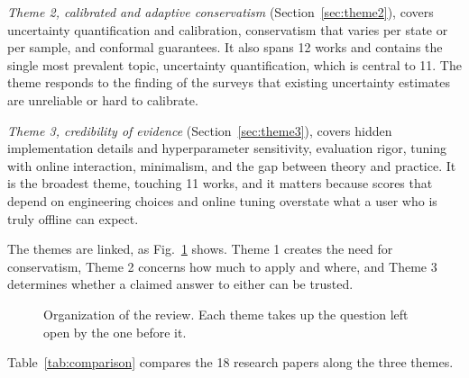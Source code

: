 \documentclass[conference]{IEEEtran}
\begin{document}
\emph{Theme 2, calibrated and adaptive conservatism} (Section~\ref{sec:theme2}), covers uncertainty quantification and calibration, conservatism that varies per state or per sample, and conformal guarantees. It also spans 12 works and contains the single most prevalent topic, uncertainty quantification, which is central to 11. The theme responds to the finding of the surveys that existing uncertainty estimates are unreliable or hard to calibrate.

\emph{Theme 3, credibility of evidence} (Section~\ref{sec:theme3}), covers hidden implementation details and hyperparameter sensitivity, evaluation rigor, tuning with online interaction, minimalism, and the gap between theory and practice. It is the broadest theme, touching 11 works, and it matters because scores that depend on engineering choices and online tuning overstate what a user who is truly offline can expect.

The themes are linked, as Fig.~\ref{fig:themes} shows. Theme 1 creates the need for conservatism, Theme 2 concerns how much to apply and where, and Theme 3 determines whether a claimed answer to either can be trusted.

\begin{figure}[!t]
\centering
{}
\caption{Organization of the review. Each theme takes up the question left open by the one before it.}
\label{fig:themes}
\end{figure} Table~\ref{tab:comparison} compares the 18 research papers along the three themes.
\end{document}
